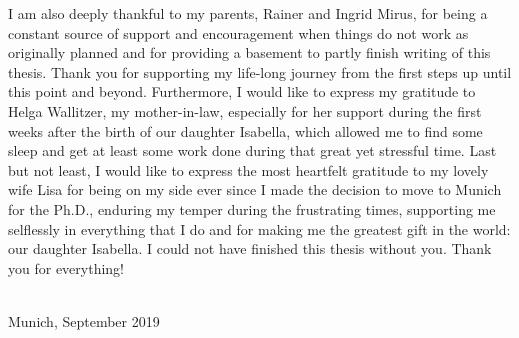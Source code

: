 I am also deeply thankful to my parents, Rainer and Ingrid Mirus, for being a constant source of support and encouragement when things do not work as originally planned and for providing a basement to partly finish writing of this thesis.
Thank you for supporting my life-long journey from the first steps up until this point and beyond.
Furthermore, I would like to express my gratitude to Helga Wallitzer, my mother-in-law, especially for her support during the first weeks after the birth of our daughter Isabella, which allowed me to find some sleep and get at least some work done during that great yet stressful time.
Last but not least, I would like to express the most heartfelt gratitude to my lovely wife Lisa for being on my side ever since I made the decision to move to Munich for the Ph.D., enduring my temper during the frustrating times, supporting me selflessly in everything that I do and for making me the greatest gift in the world: our daughter Isabella.
I could not have finished this thesis without you.
Thank you for everything! 

\vspace{1cm}
\fullname\\
Munich, September 2019
